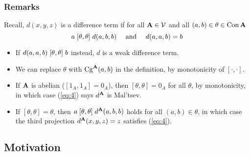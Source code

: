 \documentclass[12pt,xcolor=dvipsnames%
   ]{beamer}
\renewcommand{\defn}[1]{\alert{#1}}
\begin{document}
\begin{frame}
\frametitle{Remarks}

Recall, $d(x,y,z)$ is a \alert{difference term}
if for all $\mathbf{A} \in \mathcal{V}$ and all $(a,b) \in \theta\in \operatorname{Con}\mathbf{A}$
\begin{equation}
\label{eq:4}  
a \mathrel{[\theta, \theta]} d(a,b,b) 
\quad \text{ and } \quad
d(a,a,b) = b 
\end{equation}

\begin{itemize}
\item<2->
If $d(a,a,b) \mathrel{[\theta, \theta]} b$ instead, $d$ is a \alert{weak difference term}.
\item<3->  We can replace $\theta$ 
with $\operatorname{Cg}^{\mathbf{A}}(a,b)$ in the definition, 
by monotonicity of $[\cdot, \cdot]$.
\item<4->
  If $\mathbf{A}$ is \alert{abelian} ($[1_A, 1_A] = 0_A$), then 
  $[\theta, \theta] = 0_A$ for all $\theta$, by
  monotonicity, in which case
  (\ref{eq:4}) says $d^{\mathbf{A}}$ is Mal'tsev.
\item<5-> If $[\theta, \theta] = \theta$, then
  $a \mathrel{[\theta, \theta]} d^{\mathbf{A}}(a,b,b)$ holds
  for all $(a, b) \in \theta$, in which case
the third projection $d^{\mathbf{A}}(x,y,z) = z$ satisfies (\ref{eq:4}).
\end{itemize}


\end{frame}


\subsection{Motivation}
\end{document}
